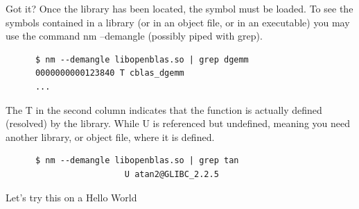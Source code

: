 \documentclass[12pt,aspectratio=169]{beamer}
\begin{document}
  
  
  \begin{frame}[fragile]{Got it?}  
    Once the library has been located, the symbol must be loaded.
    To see the symbols contained in a library (or in an object file, or in
    an executable) you may use the command nm --demangle (possibly
    piped with grep).

    \begin{verbatim}
      $ nm --demangle libopenblas.so | grep dgemm
      0000000000123840 T cblas_dgemm
      ...
    \end{verbatim}
    The \alert{T} in the second column indicates that the function is actually defined (resolved) by the library. While \alert{U} is referenced but undefined, meaning you need
    another library, or object file, where it is defined.
    \begin{verbatim}
      $ nm --demangle libopenblas.so | grep tan
                        U atan2@GLIBC_2.2.5
    \end{verbatim}
    
  \end{frame}

  \begin{frame}
    \centering
    \Large
    \color{blue} Let's try this on a Hello World
  \end{frame}
\end{document}
